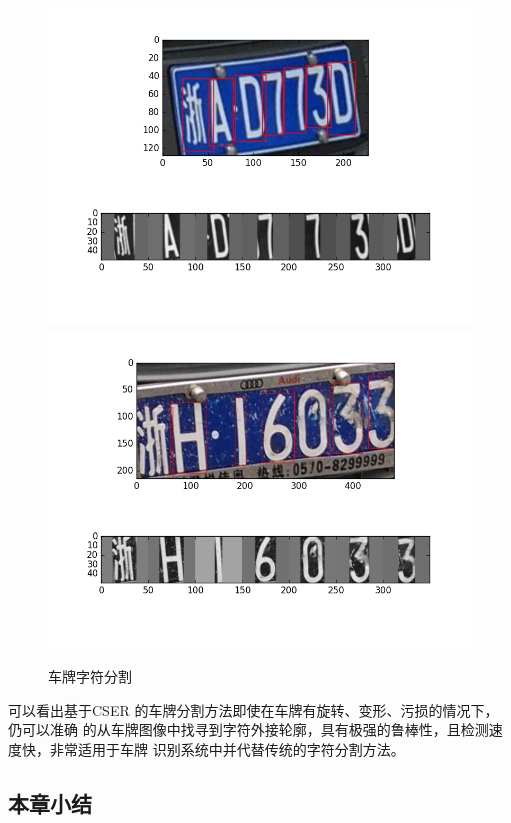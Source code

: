 \begin{figure}[th]
\centering
{}
{\includegraphics[width=1\linewidth]{./Figure/TextSegmentation.png}}
{\includegraphics[width=1\linewidth]{./Figure/TextSegmentation2.png}}
\caption{车牌字符分割}\label{Fig:TextSeg}
\end{figure}

可以看出基于CSER 的车牌分割方法即使在车牌有旋转、变形、污损的情况下，仍可以准确
的从车牌图像中找寻到字符外接轮廓，具有极强的鲁棒性，且检测速度快，非常适用于车牌
识别系统中并代替传统的字符分割方法。

\subsection{本章小结}

